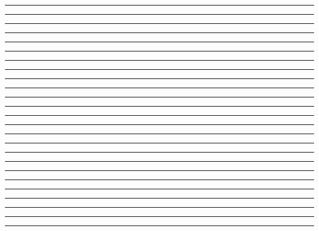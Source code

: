 \documentclass{article}
\begin{document}
\newpage
\noindent{}\rule{1cm}{0.025cm}\framebox{\rule{1cm}{1cm}}

\newpage
\noindent{}\rule{1cm}{0.025cm}

\newpage
\noindent{}\rule{1cm}{0.025cm}

\newpage
\noindent{}\rule{1cm}{0.025cm}

\newpage
\noindent{}\rule{1cm}{0.025cm}

\newpage
\noindent{}\rule{1cm}{0.025cm}

\newpage
\noindent{}\rule{1cm}{0.025cm}

\newpage
\noindent{}\rule{1cm}{0.025cm}

\newpage
\noindent{}\rule{1cm}{0.025cm}

\newpage
\noindent{}\rule{1cm}{0.025cm}

\newpage
\noindent{}\rule{1cm}{0.025cm}

\newpage
\noindent{}\rule{1cm}{0.025cm}

\newpage
\noindent{}\rule{1cm}{0.025cm}

\newpage
\noindent{}\rule{1cm}{0.025cm}

\newpage
\noindent{}\rule{1cm}{0.025cm}

\newpage
\noindent{}\rule{1cm}{0.025cm}

\newpage
\noindent{}\rule{1cm}{0.025cm}

\newpage
\noindent{}\rule{1cm}{0.025cm}

\newpage
\noindent{}\rule{1cm}{0.025cm}

\newpage
\noindent{}\rule{1cm}{0.025cm}

\newpage
\noindent{}\rule{1cm}{0.025cm}

\newpage
\noindent{}\rule{1cm}{0.025cm}

\newpage
\noindent{}\rule{1cm}{0.025cm}

\newpage
\noindent{}\rule{1cm}{0.025cm}

\newpage
\noindent{}\rule{1cm}{0.025cm}
\end{document}
